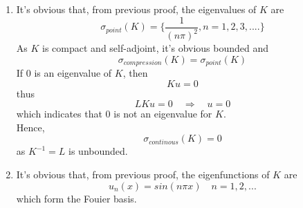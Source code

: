 \documentclass[paper=a4, fontsize=11pt]{scrartcl} %
\numberwithin{equation}{section} %
\numberwithin{figure}{section} %
\numberwithin{table}{section} %
\begin{document}
\begin{enumerate}
\begin{proof}
\begin{enumerate}
\begin{equation}
		 					C_2 = 0
		 				\end{equation}
		 				and
		 				\begin{equation}
		 					C_1 sin(\sqrt{\lambda_n}) = 0
		 				\end{equation}
		 				Thus
		 				\begin{equation}
		 					\lambda_n = (n\pi)^2
		 				\end{equation}
		 				and
		 				\begin{equation}
		 					\psi_n(x) = C_2 sin(n\pi x) \quad (C_2 \neq 0)
		 				\end{equation}
		 			\item 
		 				If $\lambda_n = 0$, then
		 				\begin{equation}
		 					\psi_n(x) = C_0 + C_1 x
		 				\end{equation}
		 				Apply the B.C. yields $C_0 = C_1 = 0$, which indicates 0 is not an eigenvalue for $L$.
		 			\item 
		 				If $\lambda_n < 0$, then
		 				\begin{equation}
		 					\psi_n(x) = C_1 e^{\sqrt{-\lambda_n}x} + C_2 e^{-\sqrt{-\lambda_n}x}
		 				\end{equation}
		 				Apply the B.C. yields $C_0 = C_1 = 0$, which indicates  $\lambda_n < 0$ are not eigenvalues for $L$.
		 		\end{enumerate}
			\end{proof}
		\item 
			It's obvious that, from previous proof, the eigenvalues of $K$ are
			\begin{equation}
				\sigma_{point}(K) = \{\frac{1}{(n\pi)^2}, n=1,2,3, ....\}
			\end{equation} 
			As $K$ is compact and self-adjoint, it's obvious bounded and
			\begin{equation}
				\sigma_{compression}(K) = \sigma_{point}(K)
			\end{equation} 
			If $0$ is an eigenvalue of $K$, then
			\begin{equation}
				Ku = 0
			\end{equation}
			thus
			\begin{equation}
				LKu = 0 \quad \Rightarrow \quad u = 0
			\end{equation}
			which indicates that 0 is not an eigenvalue for $K$.\\
			Hence, 
			\begin{equation}
				\sigma_{continous}(K) = {0}
			\end{equation}
			as $K^{-1} = L$ is unbounded.
		\item 
			It's obvious that, from previous proof, the eigenfunctions of $K$ are
			\begin{equation}
				u_n(x) = sin(n\pi x) \quad n = 1, 2, ...
			\end{equation}
			which form the Fouier basis.
	\end{enumerate}
\end{document}
